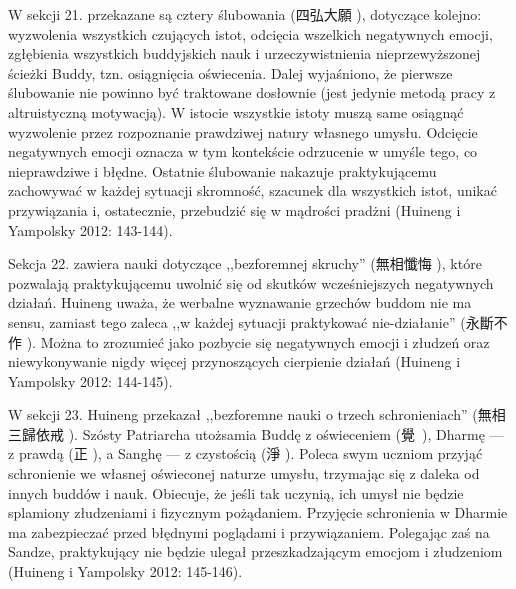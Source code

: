 W sekcji 21. przekazane są cztery ślubowania (四弘大願 ), dotyczące kolejno: wyzwolenia wszystkich czujących istot, odcięcia wszelkich negatywnych emocji, zgłębienia wszystkich buddyjskich nauk i urzeczywistnienia nieprzewyższonej ścieżki Buddy, tzn. osiągnięcia oświecenia. Dalej wyjaśniono, że pierwsze ślubowanie nie powinno być traktowane dosłownie (jest jedynie metodą pracy z altruistyczną motywacją). W istocie wszystkie istoty muszą same osiągnąć wyzwolenie przez rozpoznanie prawdziwej natury własnego umysłu. Odcięcie negatywnych emocji oznacza w tym kontekście odrzucenie w umyśle tego, co nieprawdziwe i błędne. Ostatnie ślubowanie nakazuje praktykującemu zachowywać w każdej sytuacji skromność, szacunek dla wszystkich istot, unikać przywiązania i, ostatecznie, przebudzić się w mądrości pradżni (Huineng i Yampolsky 2012: 143-144).

Sekcja 22. zawiera nauki dotyczące ,,bezforemnej skruchy'' (無相懺悔 ), które pozwalają praktykującemu uwolnić się od skutków wcześniejszych negatywnych działań. Huineng uważa, że werbalne wyznawanie grzechów buddom nie ma sensu, zamiast tego zaleca ,,w każdej sytuacji praktykować nie-działanie'' (永斷不作 ). Można to zrozumieć jako pozbycie się negatywnych emocji i złudzeń oraz niewykonywanie nigdy więcej przynoszących cierpienie działań (Huineng i Yampolsky 2012: 144-145).

W sekcji 23. Huineng przekazał ,,bezforemne nauki o trzech schronieniach'' (無相三歸依戒 ).
Szósty Patriarcha utożsamia Buddę z oświeceniem (覺~), Dharmę --- z prawdą (正 ), a Sanghę --- z czystością (淨 ).
Poleca swym uczniom przyjąć schronienie we własnej oświeconej naturze umysłu, trzymając się z daleka od innych buddów i nauk.
Obiecuje, że jeśli tak uczynią, ich umysł nie będzie splamiony złudzeniami i fizycznym pożądaniem.
Przyjęcie schronienia w Dharmie ma zabezpieczać przed błędnymi poglądami i przywiązaniem.
Polegając zaś na Sandze, praktykujący nie będzie ulegał przeszkadzającym emocjom i złudzeniom
(Huineng i Yampolsky 2012: 145-146).

